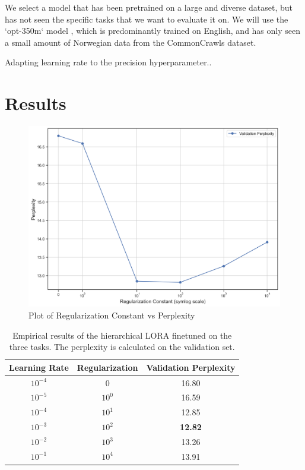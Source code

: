 \documentclass{article}
\begin{document}
We select a model that has been pretrained on a large and diverse dataset, but has not seen the specific tasks that we want to evaluate it on. We will use the `opt-350m` model \cite{zhang_opt_2022}, which is predominantly trained on English, and has only seen a small amount of Norwegian data from the CommonCrawls dataset.

Adapting learning rate to the precision hyperparameter..

\section{Results}

\begin{figure}[h]
    \centering
    \includegraphics[width=\textwidth]{figures/results_plot.png}
    \caption{Plot of Regularization Constant vs Perplexity}
    \label{fig:results_plot}
\end{figure}

\begin{table}[h]
\centering
\caption{Empirical results of the hierarchical LORA finetuned on the three tasks. The perplexity is calculated on the validation set.}
\label{tbl:results}
\begin{tabular}{ccc}
    \toprule
    Learning Rate & Regularization & Validation Perplexity \\
    \midrule
        $10^{-4}$ &              0 &                 16.80 \\
        $10^{-5}$ &       $10^{0}$ &                 16.59 \\
        $10^{-4}$ &       $10^{1}$ &                 12.85 \\
        $10^{-3}$ &       $10^{2}$ &                 \textbf{12.82} \\
        $10^{-2}$ &       $10^{3}$ &                 13.26 \\
        $10^{-1}$ &       $10^{4}$ &                 13.91 \\
    \bottomrule
    \end{tabular}
\end{table}
\end{document}
